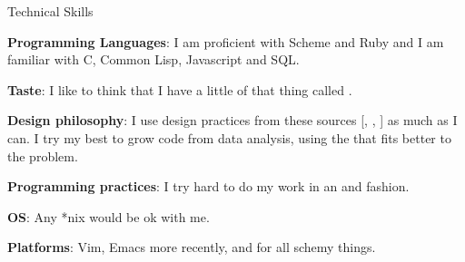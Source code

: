 \begin{rubric}{Technical Skills}{ 

    \entry* \textbf{Programming Languages}: I am proficient with
    Scheme and Ruby and I am familiar with C, Common Lisp, Javascript and SQL.
    
    \entry* \textbf{Taste}: I like to think that I have a little of that thing
    called .

    \entry* \textbf{Design philosophy}: I use design practices from
    these sources
    [,
     ,
     ]
    as much as I can. I try my best to grow code from data analysis,
    using the
    that fits better to the problem.

    \entry* \textbf{Programming practices}: I try hard to do my work in an
    and
    fashion.

    \entry* \textbf{OS}: Any *nix would be ok with me.

   \entry* \textbf{Platforms}: Vim, Emacs more recently, and
    for all schemy things.

}\end{rubric}
